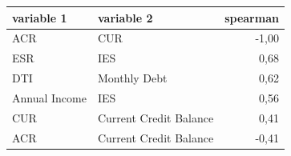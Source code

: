 \begin{tabular}{llr}
\toprule
\textbf{variable 1} & \textbf{variable 2} & \textbf{spearman} \\
\midrule
ACR & CUR & -1,00 \\
ESR & IES & 0,68 \\
DTI & Monthly Debt & 0,62 \\
Annual Income & IES & 0,56 \\
CUR & Current Credit Balance & 0,41 \\
ACR & Current Credit Balance & -0,41 \\
\bottomrule
\end{tabular}
